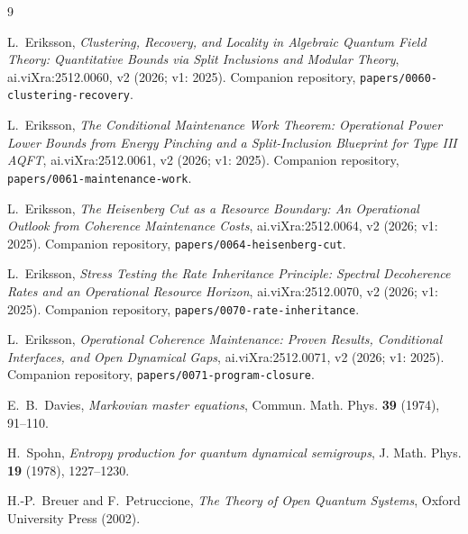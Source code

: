 \documentclass[11pt,a4paper]{article}
\theoremstyle{plain}
\theoremstyle{definition}
\theoremstyle{remark}
\begin{document}
\begin{thebibliography}{9}\small

 L.~Eriksson, \emph{Clustering, Recovery, and Locality in
Algebraic Quantum Field Theory: Quantitative Bounds via Split Inclusions and
Modular Theory}, ai.viXra:2512.0060, v2 (2026; v1: 2025). Companion
repository, \texttt{papers/0060-clustering-recovery}.

 L.~Eriksson, \emph{The Conditional Maintenance Work
Theorem: Operational Power Lower Bounds from Energy Pinching and a
Split-Inclusion Blueprint for Type III AQFT}, ai.viXra:2512.0061, v2 (2026;
v1: 2025). Companion repository, \texttt{papers/0061-maintenance-work}.

 L.~Eriksson, \emph{The Heisenberg Cut as a Resource Boundary:
An Operational Outlook from Coherence Maintenance Costs}, ai.viXra:2512.0064,
v2 (2026; v1: 2025). Companion repository,
\texttt{papers/0064-heisenberg-cut}.

 L.~Eriksson, \emph{Stress Testing the Rate Inheritance
Principle: Spectral Decoherence Rates and an Operational Resource Horizon},
ai.viXra:2512.0070, v2 (2026; v1: 2025). Companion repository,
\texttt{papers/0070-rate-inheritance}.

 L.~Eriksson, \emph{Operational Coherence Maintenance:
Proven Results, Conditional Interfaces, and Open Dynamical Gaps},
ai.viXra:2512.0071, v2 (2026; v1: 2025). Companion repository,
\texttt{papers/0071-program-closure}.

 E.~B.~Davies, \emph{Markovian master equations}, Commun.
Math. Phys. \textbf{39} (1974), 91--110.

 H.~Spohn, \emph{Entropy production for quantum dynamical
semigroups}, J. Math. Phys. \textbf{19} (1978), 1227--1230.

 H.-P.~Breuer and F.~Petruccione, \emph{The Theory
of Open Quantum Systems}, Oxford University Press (2002).

\end{thebibliography}
\end{document}
